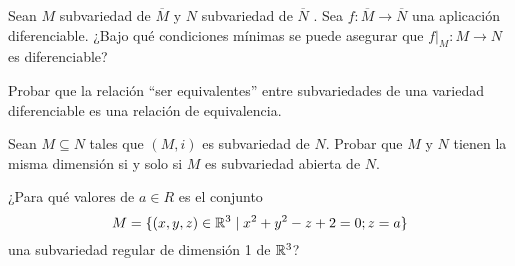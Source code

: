 \documentclass[twoside]{article}
\newcounter{ejercicio}
\begin{document}
\newpage

\begin{ejercicio}{12}
Sean $M$ subvariedad de $\overline{M}$ y $N$ subvariedad de $\overline{N}$ . Sea $f : \overline{M} \to \overline{N}$ una
aplicación diferenciable. ¿Bajo qué condiciones mínimas se puede asegurar
que $f|_M : M \to N$ es diferenciable?
\end{ejercicio}
\begin{solucion}
\end{solucion}

\newpage

\begin{ejercicio}{13}
Probar que la relación ``ser equivalentes'' entre subvariedades de una variedad
diferenciable es una relación de equivalencia.
\end{ejercicio}
\begin{solucion}
\end{solucion}

\newpage

\begin{ejercicio}{14}
Sean $M \subseteq N$ tales que $(M, i)$ es subvariedad de $N$. Probar que $M$ y $N$
tienen la misma dimensión si y solo si $M$ es subvariedad abierta de $N$.
\end{ejercicio}
\begin{solucion}
\end{solucion}

\newpage

\begin{ejercicio}{15}
¿Para qué valores de $a \in R$ es el conjunto
$$M = \{(x, y, z) \in \mathbb{R}^3\mid x^2 + y^2 - z + 2 = 0; z = a\}$$
una subvariedad regular de dimensión 1 de $\mathbb{R}^3$?
\end{ejercicio}
\begin{solucion}
\end{solucion}
\end{document}
